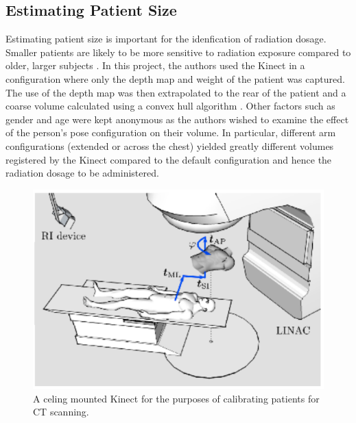 


\subsection{Estimating Patient Size}


Estimating patient size is important for the idenfication of radiation dosage. Smaller patients are likely to be more sensitive to radiation exposure compared to older, larger subjects \cite{McCollough2011}. In this project, the authors used the Kinect in a configuration where only the depth map and weight of the patient was captured. The use of the depth map was then extrapolated to the rear of the patient and a coarse volume calculated using a convex hull algorithm \cite{Cook2013}. Other factors such as gender and age were kept anonymous as the authors wished to examine the effect of the person's pose configuration on their volume. In particular, different arm configurations (extended or across the chest) yielded greatly different volumes registered by the Kinect compared to the default configuration and hence the radiation dosage to be administered. \\

\begin{figure}[htb]
\begin{center}
    \includegraphics[scale=0.5]{images/celingkinectconfig.PNG}
    \caption{A celing mounted Kinect for the purposes of calibrating patients for CT scanning.}
\end{center}
\end{figure}

